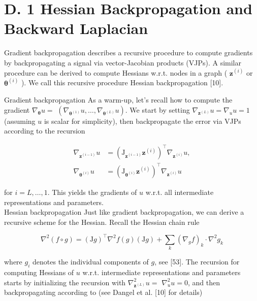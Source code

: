 \documentclass[10pt]{article}
\begin{document}
\section*{D. 1 Hessian Backpropagation and Backward Laplacian}
Gradient backpropagation describes a recursive procedure to compute gradients by backpropagating a signal via vector-Jacobian products (VJPs). A similar procedure can be derived to compute Hessians w.r.t. nodes in a graph ( $\boldsymbol{z}^{(i)}$ or $\boldsymbol{\theta}^{(i)}$ ). We call this recursive procedure Hessian backpropagation [10].

Gradient backpropagation As a warm-up, let's recall how to compute the gradient $\nabla_{\boldsymbol{\theta}} u=$ $\left(\nabla_{\boldsymbol{\theta}^{(1)}} u, \ldots, \nabla_{\boldsymbol{\theta}^{(L)}} u\right)$. We start by setting $\nabla_{\boldsymbol{z}^{(L)}} u=\nabla_{u} u=1$ (assuming $u$ is scalar for simplicity), then backpropagate the error via VJPs according to the recursion


\begin{align*}
\nabla_{\boldsymbol{z}^{(i-1)}} u & =\left(\mathrm{J}_{\boldsymbol{z}^{(i-1)}} \boldsymbol{z}^{(i)}\right)^{\top} \nabla_{\boldsymbol{z}^{(i)}} u, \\
\nabla_{\boldsymbol{\theta}^{(i)}} u & =\left(\mathrm{J}_{\boldsymbol{\theta}^{(i)}} \boldsymbol{z}^{(i)}\right)^{\top} \nabla_{\boldsymbol{z}^{(i)}} u \tag{D35}
\end{align*}


for $i=L, \ldots, 1$. This yields the gradients of $u$ w.r.t. all intermediate representations and parameters.\\
Hessian backpropagation Just like gradient backpropagation, we can derive a recursive scheme for the Hessian. Recall the Hessian chain rule


\begin{equation*}
\nabla^{2}(f \circ g)=(\mathrm{J} g)^{\top} \nabla^{2} f(g)(\mathrm{J} g)+\sum_{k}\left(\nabla_{g} f\right)_{k} \cdot \nabla^{2} g_{k} \tag{D36}
\end{equation*}


where $g_{i}$ denotes the individual components of $g$, see [53]. The recursion for computing Hessians of $u$ w.r.t. intermediate representations and parameters starts by initializing the recursion with $\nabla_{\boldsymbol{z}^{(L)}}^{2} u=$ $\nabla_{u}^{2} u=0$, and then backpropagating according to (see Dangel et al. [10] for details)
\end{document}
